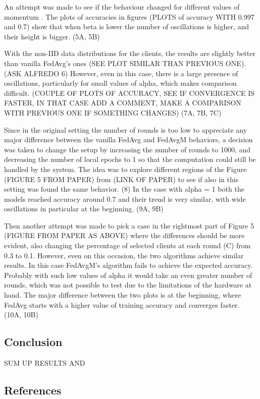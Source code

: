 \documentclass[twocolumn]{article}
\begin{document}
An attempt was made to see if the behaviour changed for different values of momentum . The plots of accuracies in figures (PLOTS of accuracy WITH 0.997 and 0.7) show that when beta is lower the number of oscillations is higher, and their height is bigger.
(5A, 5B)

With the non-IID data distributions for the clients, the results are slightly better than vanilla FedAvg's ones (SEE PLOT SIMILAR THAN PREVIOUS ONE). 
(ASK ALFREDO 6)
However, even in this case, there is a large presence of oscillations, particularly for small values of alpha, which makes comparison difficult.
(COUPLE OF PLOTS OF ACCURACY, SEE IF CONVERGENCE IS FASTER, IN THAT CASE ADD A COMMENT, MAKE A COMPARISON WITH PREVIOUS ONE IF SOMETHING CHANGES)
(7A, 7B, 7C)

Since in the original setting the number of rounds is too low to appreciate any major difference between the vanilla FedAvg and FedAvgM behaviors, a decision was taken to change the setup by increasing the number of rounds to 1000, and decreasing the number of local epochs to 1 so that the computation could still be handled by the system.
The idea was to explore different regions of the Figure (FIGURE 5 FROM PAPER) from (LINK OF PAPER) to see if also in this setting was found the same behavior.
(8)
In the case with alpha = 1 both the models reached accuracy around 0.7 and their trend is very similar, with wide oscillations in particular at the beginning.
(9A, 9B)

Then another attempt was made to pick a case in the rightmost part of Figure 5 (FIGURE FROM PAPER AS ABOVE) where the differences should be more evident, also changing the percentage of selected clients at each round (C) from 0.3 to 0.1. 
However, even on this occasion, the two algorithms achieve similar results. In this case FedAvgM's algorithm fails to achieve the expected accuracy. Probably with such low values of alpha it would take an even greater number of rounds, which was not possible to test due to the limitations of the hardware at hand. The major difference between the two plots is at the beginning, where FedAvg starts with a higher value of training accuracy and converges faster.
(10A, 10B)



\subsection{Conclusion}
SUM UP RESULTS AND 
\subsection{References}
\end{document}
